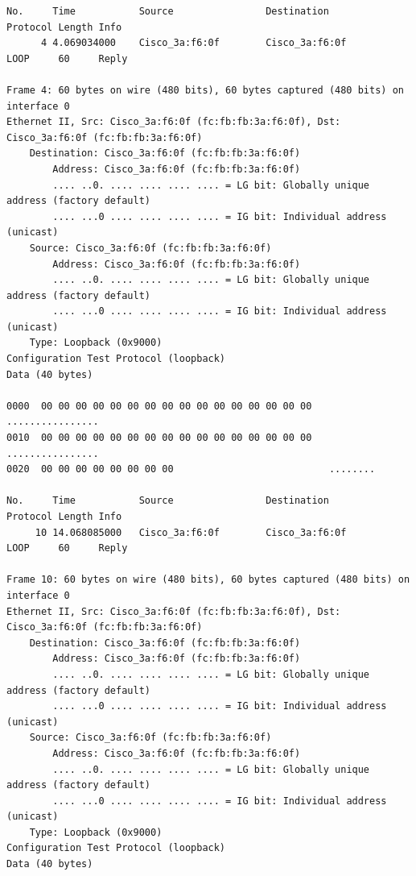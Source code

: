 \documentclass[a4paper,11pt]{article}
\begin{document}
\lstset{showstringspaces=false,
		frame=tb,
		caption=WireShark Exp 2.2 - PC 1 }
		
\begin{lstlisting}
No.     Time           Source                Destination           Protocol Length Info
      4 4.069034000    Cisco_3a:f6:0f        Cisco_3a:f6:0f        LOOP     60     Reply

Frame 4: 60 bytes on wire (480 bits), 60 bytes captured (480 bits) on interface 0
Ethernet II, Src: Cisco_3a:f6:0f (fc:fb:fb:3a:f6:0f), Dst: Cisco_3a:f6:0f (fc:fb:fb:3a:f6:0f)
    Destination: Cisco_3a:f6:0f (fc:fb:fb:3a:f6:0f)
        Address: Cisco_3a:f6:0f (fc:fb:fb:3a:f6:0f)
        .... ..0. .... .... .... .... = LG bit: Globally unique address (factory default)
        .... ...0 .... .... .... .... = IG bit: Individual address (unicast)
    Source: Cisco_3a:f6:0f (fc:fb:fb:3a:f6:0f)
        Address: Cisco_3a:f6:0f (fc:fb:fb:3a:f6:0f)
        .... ..0. .... .... .... .... = LG bit: Globally unique address (factory default)
        .... ...0 .... .... .... .... = IG bit: Individual address (unicast)
    Type: Loopback (0x9000)
Configuration Test Protocol (loopback)
Data (40 bytes)

0000  00 00 00 00 00 00 00 00 00 00 00 00 00 00 00 00   ................
0010  00 00 00 00 00 00 00 00 00 00 00 00 00 00 00 00   ................
0020  00 00 00 00 00 00 00 00                           ........

No.     Time           Source                Destination           Protocol Length Info
     10 14.068085000   Cisco_3a:f6:0f        Cisco_3a:f6:0f        LOOP     60     Reply

Frame 10: 60 bytes on wire (480 bits), 60 bytes captured (480 bits) on interface 0
Ethernet II, Src: Cisco_3a:f6:0f (fc:fb:fb:3a:f6:0f), Dst: Cisco_3a:f6:0f (fc:fb:fb:3a:f6:0f)
    Destination: Cisco_3a:f6:0f (fc:fb:fb:3a:f6:0f)
        Address: Cisco_3a:f6:0f (fc:fb:fb:3a:f6:0f)
        .... ..0. .... .... .... .... = LG bit: Globally unique address (factory default)
        .... ...0 .... .... .... .... = IG bit: Individual address (unicast)
    Source: Cisco_3a:f6:0f (fc:fb:fb:3a:f6:0f)
        Address: Cisco_3a:f6:0f (fc:fb:fb:3a:f6:0f)
        .... ..0. .... .... .... .... = LG bit: Globally unique address (factory default)
        .... ...0 .... .... .... .... = IG bit: Individual address (unicast)
    Type: Loopback (0x9000)
Configuration Test Protocol (loopback)
Data (40 bytes)


\end{lstlisting}
\end{document}
